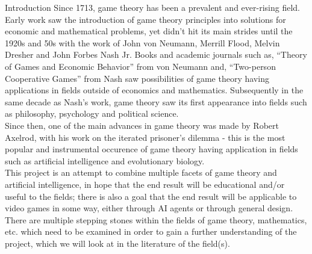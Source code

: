 \documentclass[12pt,a4paper]{article}
\makeatletter
\renewcommand\section{\@startsection {section}{1}{0mm}
                               {4pt plus 2pt minus 1pt}
                               {4pt plus 0pt}
                               {\bfseries}}
\makeatother
\begin{document}
\section{Introduction}
Since 1713, game theory has been a prevalent and ever-rising field. Early work saw the introduction of game theory principles into solutions for economic and mathematical problems, yet didn't hit its main strides until the 1920s and 50s with the work of John von Neumann, Merrill Flood, Melvin Dresher and John Forbes Nash Jr. Books and academic journals such as, “Theory of Games and Economic Behavior”\cite{47} from von Neumann and, “Two-person Cooperative Games”\cite{24} from Nash saw possibilities of game theory having applications in fields outside of economics and mathematics. Subsequently in the same decade as Nash's work, game theory saw its first appearance into fields such as philosophy, psychology and political science. \\
Since then, one of the main advances in game theory was made by Robert Axelrod, with his work on the iterated prisoner's dilemma - this is the most popular and instrumental occurence of game theory having application in fields such as artificial intelligence and evolutionary biology. \\
This project is an attempt to combine multiple facets of game theory and artificial intelligence, in hope that the end result will be educational and/or useful to the fields; there is also a goal that the end result will be applicable to video games in some way, either through AI agents or through general design. There are multiple stepping stones within the fields of game theory, mathematics, etc. which need to be examined in order to gain a further understanding of the project, which we will look at in the literature of the field(s).
\end{document}

